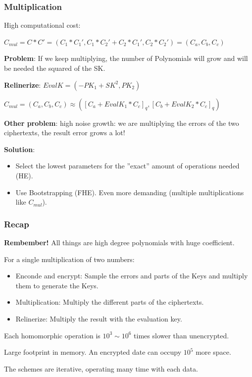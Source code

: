\documentclass[10pt,handout]{beamer}
\begin{document}
\begin{frame}
\frametitle{Multiplication}

    High computational cost:
    \vspace{-0.15cm}

    $C_{mul} = C*C' = (C_1*C_1',C_1*C_2'+C_2*C_1', C_2*C_2') = (C_a,C_b,C_c)$
    \vspace{-0.15cm}

    \textbf{Problem}: If we keep multiplying, the number of Polynomials will grow and will be needed
    the squared of the SK.

    \textbf{Relinerize}:
    $EvalK = (-PK_1+SK^2, PK_2)$

    $C_{mul} = (C_a, C_b, C_c)\approx ([C_a+EvalK_1*C_c]_q, [C_b+EvalK_2*C_c]_q)$

    \textbf{Other problem}: high noise growth: we are multiplying the errors of the two ciphertexts, the result error
    grows a lot!
\vspace{-0.1cm}

    \textbf{Solution}: \vspace{-0.3cm}
    \begin{itemize} \vspace{-0.2cm}
        \item Select the lowest parameters for the ''exact'' amount  of operations needed (HE). \vspace{-0.2cm}
            \vspace{-0.25cm}
        \item Use Bootstrapping  (FHE). Even more demanding (multiple multiplications like $C_{mul}$).
    \end{itemize}
\end{frame}

\begin{frame}
\frametitle{Recap}

    \textbf{Rembember!} All things are high degree polynomials with huge coefficient.

For a single multiplication of two numbers:
\begin{itemize}
    \item Enconde and encrypt: Sample the errors and parts of the Keys and multiply them to generate the Keys.
    \item Multiplication: Multiply the different parts of the ciphertexts.
    \item Relinerize: Multiply the result with the evaluation key.
\end{itemize}

Each homomorphic operation is $10^3 \sim 10^6$ times slower than unencrypted.
\pause

Large footprint in memory.
An encrypted date can occupy $10^5$ more space.

\pause
The schemes are iterative, operating many time with each data.
\pause



\end{frame}
\end{document}
